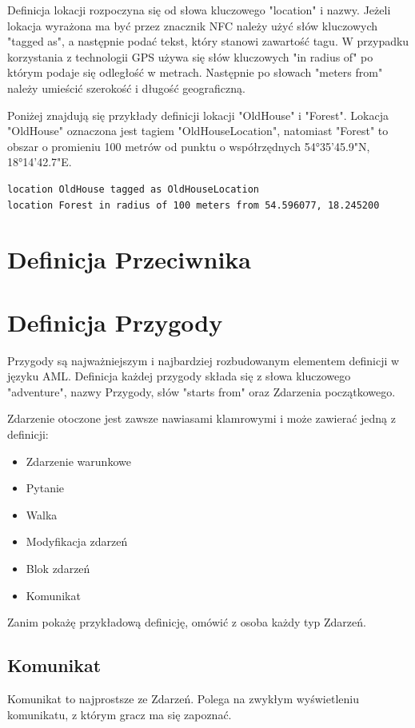 \documentclass	{xmgr}
\begin{document}
Definicja lokacji rozpoczyna się od słowa kluczowego "location" i nazwy. Jeżeli lokacja wyrażona ma być przez znacznik NFC należy użyć słów kluczowych "tagged as", a następnie podać tekst, który stanowi zawartość tagu. W przypadku korzystania z technologii GPS używa się słów kluczowych "in radius of" po którym podaje się odległość w metrach. Następnie po słowach "meters from" należy umieścić szerokość i długość geograficzną.

Poniżej znajdują się przykłady definicji lokacji "OldHouse" i "Forest". Lokacja "OldHouse" oznaczona jest tagiem "OldHouseLocation", natomiast 
"Forest" to obszar o promieniu 100 metrów od punktu o współrzędnych 54°35'45.9"N, 18°14'42.7"E.
\begin{lstlisting}
location OldHouse tagged as OldHouseLocation
location Forest in radius of 100 meters from 54.596077, 18.245200
\end{lstlisting}

\section{Definicja Przeciwnika}

\section{Definicja Przygody}
Przygody są najważniejszym i najbardziej rozbudowanym elementem definicji w języku AML. 
Definicja każdej przygody składa się z słowa kluczowego "adventure", nazwy Przygody, słów "starts from" oraz Zdarzenia początkowego.

Zdarzenie otoczone jest zawsze nawiasami klamrowymi i może zawierać jedną z definicji:
\begin{itemize}
	\item Zdarzenie warunkowe
	\item Pytanie
	\item Walka
	\item Modyfikacja zdarzeń
	\item Blok zdarzeń
	\item Komunikat
\end{itemize}

Zanim pokażę przykładową definicję, omówić z osoba każdy typ Zdarzeń.
\subsection*{Komunikat}
Komunikat to najprostsze ze Zdarzeń. Polega na zwykłym wyświetleniu komunikatu, z którym gracz ma się zapoznać.
\end{document}
